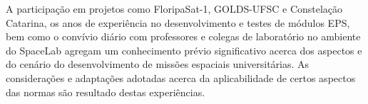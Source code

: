 A participação em projetos como FloripaSat-1, GOLDS-UFSC e Constelação Catarina, os anos de experiência no desenvolvimento e testes de módulos \gls{EPS}, bem como o convívio diário com professores e colegas de laboratório no ambiente do SpaceLab agregam um conhecimento prévio significativo acerca dos aspectos e do cenário do desenvolvimento de missões espaciais universitárias.
As considerações e adaptações adotadas acerca da aplicabilidade de certos aspectos das normas são resultado destas experiências.